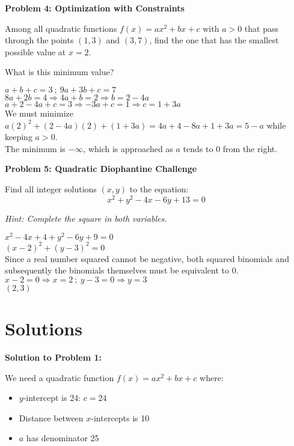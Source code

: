 \documentclass[12pt]{article}
\begin{document}
\newpage

\textbf{Problem 4: Optimization with Constraints}

Among all quadratic functions $f(x) = ax^2 + bx + c$ with $a > 0$ that pass through the points $(1, 3)$ and $(3, 7)$, find the one that has the smallest possible value at $x = 2$.

What is this minimum value?

\begin{minipage}[t][5cm][t]{\linewidth}
    $\displaystyle a+b+c=3 \ ; \ 9a+3b+c=7$
    \\[8pt] $8a+2b=4 \Rightarrow 4a+b=2 \Rightarrow b=2-4a$
    \\[8pt] $a+2-4a+c=3 \Rightarrow -3a+c=1 \Rightarrow c=1+3a$
    \\[8pt] We must minimize $a(2)^2+(2-4a)(2)+(1+3a)=4a+4-8a+1+3a=5-a$ while keeping $a>0$.
    \\[8pt] The minimum is $-\infty$, which is approached as $a$ tends to 0 from the right.
\end{minipage}

\textbf{Problem 5: Quadratic Diophantine Challenge}

Find all integer solutions $(x, y)$ to the equation:
$$x^2 + y^2 - 4x - 6y + 13 = 0$$

\textit{Hint: Complete the square in both variables.}

\begin{minipage}[t][5cm][t]{\linewidth}
    $\displaystyle x^2-4x+4+y^2-6y+9=0$
    \\[8pt] $(x-2)^2+(y-3)^2=0$
    \\[8pt] Since a real number squared cannot be negative, both squared binomials and subsequently the binomials themselves must be equivalent to 0.
    \\[8pt] $x-2=0 \Rightarrow x=2 \ ; \ y-3=0 \Rightarrow y=3$
    \\[8pt] $(2, 3)$
\end{minipage}

\newpage

\section{Solutions}

\textbf{Solution to Problem 1:}

We need a quadratic function $f(x) = ax^2 + bx + c$ where:
\begin{itemize}
\item $y$-intercept is 24: $c = 24$
\item Distance between $x$-intercepts is 10
\item $a$ has denominator 25
\end{itemize}
\end{document}

